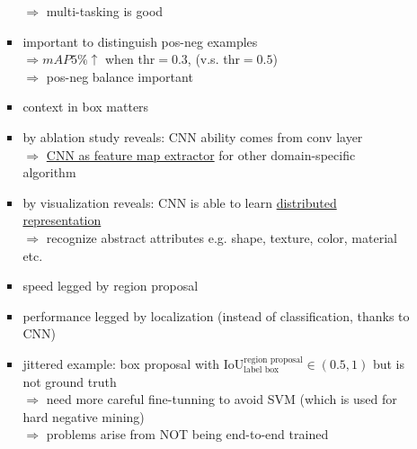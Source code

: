 \begin{itemize}
\begin{itemize}
\begin{itemize}
		$\Rightarrow$ multi-tasking is good
		\item important to distinguish pos-neg examples \\ 
		$\Rightarrow mAP 5\%\uparrow$ when thr$=0.3$, (v.s. thr$=0.5$) \\
		$\Rightarrow$ pos-neg balance important
		\item context in box matters
		\item by ablation study reveals: CNN ability comes from conv layer \\
		$\Rightarrow$ \underline{CNN as feature map extractor} for other domain-specific algorithm
		\item by visualization reveals: CNN is able to learn \underline{distributed representation} \\
		$\Rightarrow$ recognize abstract attributes e.g. shape, texture, color, material etc.
		\item speed legged by region proposal
		\item performance legged by localization (instead of classification, thanks to CNN)
		\item jittered example: box proposal with $\text{IoU}^\text{region proposal}_\text{label box}\in(0.5, 1)$ but is not ground truth \\
		$\Rightarrow$ need more careful fine-tunning to avoid SVM (which is used for hard negative mining) \\
		$\Rightarrow$ problems arise from NOT being end-to-end trained
		\end{itemize}
	\end{itemize}


\end{itemize}
